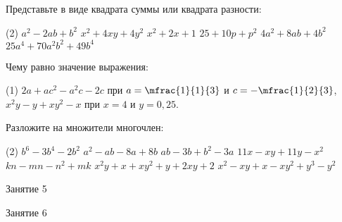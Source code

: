 \begin{homework}[number=2]
	\begin{listofex}
		\item Представьте в виде квадрата суммы или квадрата разности:
		\begin{tasks}(2)
			\task \( a^2-2ab+b^2 \)
			\task \( x^2+4xy+4y^2 \)
			\task \( x^2+2x+1 \)
			\task \( 25+10p+p^2 \)
			\task \( 4a^2+8ab+4b^2 \)
			\task \( 25a^4+70a^2b^2+49b^4 \)
		\end{tasks}
		\item Чему равно значение выражения:
		\begin{tasks}(1)
			\task \( 2a+ac^2-a^2c-2c \) при \( a=\mfrac{1}{1}{3} \) и \( c=-\mfrac{1}{2}{3}  \),
			\task \( x^2y-y+xy^2-x \) при \( x=4 \) и \( y=0,25 \).
		\end{tasks}
		\item Разложите на множители многочлен:
		\begin{tasks}(2)
			\task \( b^6-3b^4-2b^2 \)
			\task \( a^2-ab-8a+8b \)
			\task \( ab-3b+b^2-3a \)
			\task \( 11x-xy+11y-x^2 \)
			\task \( kn-mn-n^2+mk \)
			\task \( x^2y+x+xy^2+y+2xy+2 \)
			\task \( x^2-xy+x-xy^2+y^3-y^2 \)
		\end{tasks}
		
	\end{listofex}
\end{homework}

\begin{class}[number=5]
	\begin{listofex}
		\item Занятие 5
	\end{listofex}
\end{class}

\begin{class}[number=6]
	\begin{listofex}
		\item Занятие 6
	\end{listofex}
\end{class}

